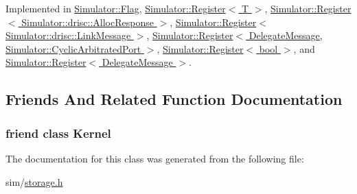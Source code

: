 Implemented in \hyperlink{class_simulator_1_1_flag_a3edbc0d4d4e12e0c425cbb05381c60ad}{Simulator\+::\+Flag}, \hyperlink{class_simulator_1_1_register_a7d424a1ce3822c36d63a0e4bb86c3730}{Simulator\+::\+Register$<$ T $>$}, \hyperlink{class_simulator_1_1_register_a7d424a1ce3822c36d63a0e4bb86c3730}{Simulator\+::\+Register$<$ Simulator\+::drisc\+::\+Alloc\+Response $>$}, \hyperlink{class_simulator_1_1_register_a7d424a1ce3822c36d63a0e4bb86c3730}{Simulator\+::\+Register$<$ Simulator\+::drisc\+::\+Link\+Message $>$}, \hyperlink{class_simulator_1_1_register_a7d424a1ce3822c36d63a0e4bb86c3730}{Simulator\+::\+Register$<$ Delegate\+Message, Simulator\+::\+Cyclic\+Arbitrated\+Port $>$}, \hyperlink{class_simulator_1_1_register_a7d424a1ce3822c36d63a0e4bb86c3730}{Simulator\+::\+Register$<$ bool $>$}, and \hyperlink{class_simulator_1_1_register_a7d424a1ce3822c36d63a0e4bb86c3730}{Simulator\+::\+Register$<$ Delegate\+Message $>$}.



\subsection{Friends And Related Function Documentation}
\hypertarget{class_simulator_1_1_storage_a3807a3ebd0e05ca8cb4d928025a943d2}{
\subsubsection[{Kernel}]{\setlength{\rightskip}{0pt plus 5cm}friend class {\bf Kernel}\hspace{0.3cm}{\ttfamily [friend]}}}\label{class_simulator_1_1_storage_a3807a3ebd0e05ca8cb4d928025a943d2}


The documentation for this class was generated from the following file\+:\begin{DoxyCompactItemize}
\item 
sim/\hyperlink{storage_8h}{storage.\+h}\end{DoxyCompactItemize}
